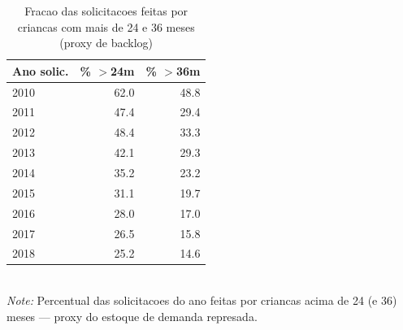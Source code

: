 \begin{table}[htbp]\centering
\caption{Fracao das solicitacoes feitas por criancas com mais de 24 e 36 meses (proxy de backlog)}
\label{tab:R3d_backlog}
\small
\begin{tabular}{lrr}
\toprule
Ano solic. & \% $>$24m & \% $>$36m \\
\midrule
2010 & 62.0 & 48.8 \\
2011 & 47.4 & 29.4 \\
2012 & 48.4 & 33.3 \\
2013 & 42.1 & 29.3 \\
2014 & 35.2 & 23.2 \\
2015 & 31.1 & 19.7 \\
2016 & 28.0 & 17.0 \\
2017 & 26.5 & 15.8 \\
2018 & 25.2 & 14.6 \\
\bottomrule
\end{tabular}
\\[3pt]{\footnotesize \textit{Note:} Percentual das solicitacoes do ano feitas por criancas acima de 24 (e 36) meses --- proxy do estoque de demanda represada.}
\end{table}
